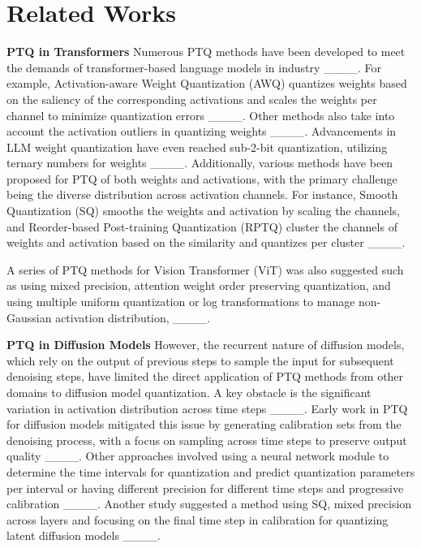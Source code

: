 \section{Related Works}
\label{sec:rw}
\textbf{PTQ in Transformers}
Numerous PTQ methods have been developed to meet the demands of transformer-based language models in industry ____. For example, Activation-aware Weight Quantization (AWQ) quantizes weights based on the saliency of the corresponding activations and scales the weights per channel to minimize quantization errors ____. Other methods also take into account the activation outliers in quantizing weights ____.  Advancements in LLM weight quantization have even reached sub-2-bit quantization, utilizing ternary numbers for weights ____. Additionally, various methods have been proposed for PTQ of both weights and activations, with the primary challenge being the diverse distribution across activation channels. For instance, Smooth Quantization (SQ) smooths the weights and activation by scaling the channels, and Reorder-based Post-training Quantization (RPTQ) cluster the channels of weights and activation based on the similarity and quantizes per cluster ____. 

A series of PTQ methods for Vision Transformer (ViT) was also suggested such as using mixed precision, attention weight order preserving quantization, and using multiple uniform quantization or log transformations to manage non-Gaussian activation distribution, ____.

\textbf{PTQ in Diffusion Models}
However, the recurrent nature of diffusion models, which rely on the output of previous steps to sample the input for subsequent denoising steps, have limited the direct application of PTQ methods from other domains to diffusion model quantization. A key obstacle is the significant variation in activation distribution across time steps ____. Early work in PTQ for diffusion models mitigated this issue by generating calibration sets from the denoising process, with a focus on sampling across time steps to preserve output quality ____. Other approaches involved using a neural network module to determine the time intervals for quantization and predict quantization parameters per interval or having different precision for different time steps and progressive calibration ____. Another study suggested a method using SQ, mixed precision across layers and focusing on the final time step in calibration for quantizing latent diffusion models ____.

